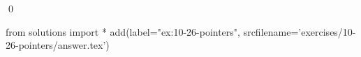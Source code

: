 
\begin{ex}
  \label{ex:10-26-pointers}
  
  \qed
\end{ex}
\begin{python0}
from solutions import *
add(label="ex:10-26-pointers",
    srcfilename='exercises/10-26-pointers/answer.tex')
\end{python0}
